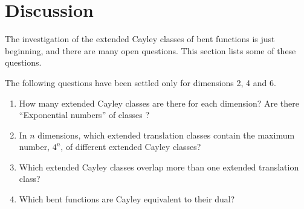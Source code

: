 \section{Discussion}
\label{sec-Discussion}
The investigation of the extended Cayley classes of bent functions is just beginning, and there are many open questions.
This section lists some of these questions.

The following questions have been settled only for dimensions 2, 4 and 6.
\begin{enumerate}
\item
How many extended Cayley classes are there for each dimension?
Are there ``Exponential numbers'' of classes  \cite{Kan83exponential}?
\item
In $n$ dimensions,
which extended translation classes contain the maximum number, $4^n$, of different extended Cayley classes?
\item
Which extended Cayley classes overlap more than one extended translation class?
\item
Which bent functions are Cayley equivalent to their dual?
\end{enumerate}

